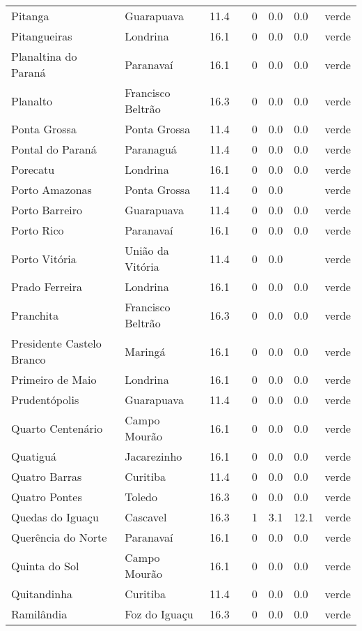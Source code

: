 \begin{longtable}{l|lllllll}
  Pitanga & Guarapuava & 11.4 &  & 0 & 0.0 & 0.0 & verde \\ 
  Pitangueiras & Londrina & 16.1 &  & 0 & 0.0 & 0.0 & verde \\ 
  Planaltina do Paraná & Paranavaí & 16.1 &  & 0 & 0.0 & 0.0 & verde \\ 
  Planalto & Francisco Beltrão & 16.3 &  & 0 & 0.0 & 0.0 & verde \\ 
  Ponta Grossa & Ponta Grossa & 11.4 &  & 0 & 0.0 & 0.0 & verde \\ 
  Pontal do Paraná & Paranaguá & 11.4 &  & 0 & 0.0 & 0.0 & verde \\ 
  Porecatu & Londrina & 16.1 &  & 0 & 0.0 & 0.0 & verde \\ 
  Porto Amazonas & Ponta Grossa & 11.4 &  & 0 & 0.0 &  & verde \\ 
  Porto Barreiro & Guarapuava & 11.4 &  & 0 & 0.0 & 0.0 & verde \\ 
  Porto Rico & Paranavaí & 16.1 &  & 0 & 0.0 & 0.0 & verde \\ 
  Porto Vitória & União da Vitória & 11.4 &  & 0 & 0.0 &  & verde \\ 
  Prado Ferreira & Londrina & 16.1 &  & 0 & 0.0 & 0.0 & verde \\ 
  Pranchita & Francisco Beltrão & 16.3 &  & 0 & 0.0 & 0.0 & verde \\ 
  Presidente Castelo Branco & Maringá & 16.1 &  & 0 & 0.0 & 0.0 & verde \\ 
  Primeiro de Maio & Londrina & 16.1 &  & 0 & 0.0 & 0.0 & verde \\ 
  Prudentópolis & Guarapuava & 11.4 &  & 0 & 0.0 & 0.0 & verde \\ 
  Quarto Centenário & Campo Mourão & 16.1 &  & 0 & 0.0 & 0.0 & verde \\ 
  Quatiguá & Jacarezinho & 16.1 &  & 0 & 0.0 & 0.0 & verde \\ 
  Quatro Barras & Curitiba & 11.4 &  & 0 & 0.0 & 0.0 & verde \\ 
  Quatro Pontes & Toledo & 16.3 &  & 0 & 0.0 & 0.0 & verde \\ 
  Quedas do Iguaçu & Cascavel & 16.3 &  & 1 & 3.1 & 12.1 & verde \\ 
  Querência do Norte & Paranavaí & 16.1 &  & 0 & 0.0 & 0.0 & verde \\ 
  Quinta do Sol & Campo Mourão & 16.1 &  & 0 & 0.0 & 0.0 & verde \\ 
  Quitandinha & Curitiba & 11.4 &  & 0 & 0.0 & 0.0 & verde \\ 
  Ramilândia & Foz do Iguaçu & 16.3 &  & 0 & 0.0 & 0.0 & verde \\ 

\end{longtable}
